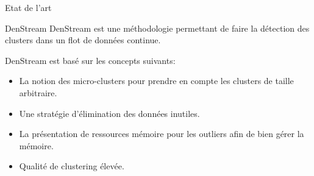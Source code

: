 \documentclass{beamer}
\begin{document}
\begin{frame}{Etat de l'art}
	
	
	
\begin{table}[ht]
	\centering
	\caption{Etude comparative des différentes méthodes de clustering en ligne incrémentale existante dans l'état de l'art} 
\end{table} 
	
	
\end{frame}

\begin{frame}{DenStream}
	DenStream est une méthodologie permettant de faire la détection des clusters dans un flot de données continue.
	
	DenStream est basé sur les concepts suivants:
	\begin{itemize}
		\item La notion des micro-clusters pour prendre en compte les clusters de taille arbitraire.
		\item Une stratégie d'élimination des données inutiles.
		\item La présentation de ressources mémoire pour les outliers afin de bien gérer la mémoire.
		\item Qualité de clustering élevée.
	\end{itemize}
	
\end{frame}
\end{document}
